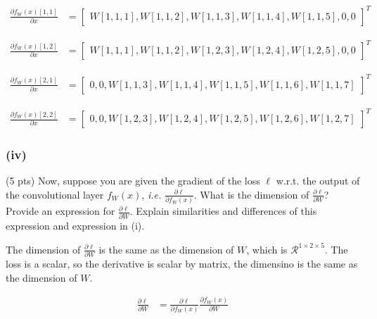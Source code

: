 \begin{enumerate}[(a)]
\begin{align}
    \frac{\partial f_{W}(x)[1, 1]}{\partial x} 
    &=\begin{bmatrix}
        W[1,1,1],  W[1,1,2], W[1,1,3], W[1,1,4], W[1,1,5], 0,0
    \end{bmatrix}^T
\end{align}

\begin{align}
    \frac{\partial f_{W}(x)[1, 2]}{\partial x} 
    &=\begin{bmatrix}
        W[1,1,1], W[1,1,2], W[1,2,3], W[1,2,4], W[1,2,5], 0, 0
    \end{bmatrix}^T
\end{align}

\begin{align}
    \frac{\partial f_{W}(x)[2, 1]}{\partial x} 
    &=\begin{bmatrix}
        0,0, W[1,1,3], W[1,1,4], W[1,1,5], W[1,1,6], W[1,1,7]
    \end{bmatrix}^T
\end{align}


\begin{align}
    \frac{\partial f_{W}(x)[2, 2]}{\partial x} 
    &=\begin{bmatrix}
        0,0, W[1,2,3], W[1,2,4], W[1,2,5], W[1,2,6], W[1,2,7]
    \end{bmatrix}^T
\end{align}

\subsubsection*{(iv)}

(5 pts) Now, suppose you are given the gradient of the loss $\ell$ w.r.t. the output of the convolutional layer $f_W(x)$, \emph{i.e.} 
    $\frac {\partial \ell}{\partial f_W(x)}$. What is the dimension of $\frac {\partial \ell}{\partial W}$? Provide an expression for $ \frac {\partial \ell}{\partial W}$. Explain similarities and differences of this expression and expression in (i).


The dimension of $\frac{\partial \ell}{\partial W}$ is the same as the dimension of $W$, which is $\mathcal{R} ^ {1 \times 2 \times 5}$. The loss is a scalar, so the derivative is scalar by matrix, the dimensino is the same as the dimension of $W$.


\begin{align}
    \frac{\partial \ell}{\partial W} 
    &=\frac{\partial \ell}{\partial f_W(x)} \frac{\partial f_W(x)}{\partial W} 
\end{align}


\end{enumerate}
